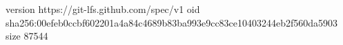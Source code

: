 version https://git-lfs.github.com/spec/v1
oid sha256:00efeb0ccbf602201a4a84c4689b83ba993e9cc83ce10403244eb2f560da5903
size 87544

